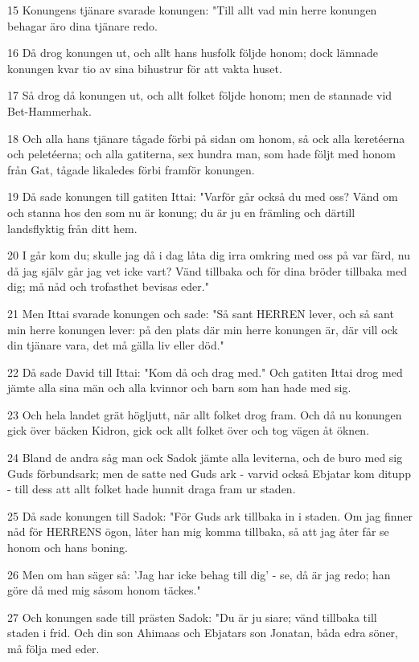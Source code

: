 \par 15 Konungens tjänare svarade konungen: "Till allt vad min herre konungen behagar äro dina tjänare redo.
\par 16 Då drog konungen ut, och allt hans husfolk följde honom; dock lämnade konungen kvar tio av sina bihustrur för att vakta huset.
\par 17 Så drog då konungen ut, och allt folket följde honom; men de stannade vid Bet-Hammerhak.
\par 18 Och alla hans tjänare tågade förbi på sidan om honom, så ock alla keretéerna och peletéerna; och alla gatiterna, sex hundra man, som hade följt med honom från Gat, tågade likaledes förbi framför konungen.
\par 19 Då sade konungen till gatiten Ittai: "Varför går också du med oss? Vänd om och stanna hos den som nu är konung; du är ju en främling och därtill landsflyktig från ditt hem.
\par 20 I går kom du; skulle jag då i dag låta dig irra omkring med oss på var färd, nu då jag själv går jag vet icke vart? Vänd tillbaka och för dina bröder tillbaka med dig; må nåd och trofasthet bevisas eder."
\par 21 Men Ittai svarade konungen och sade: "Så sant HERREN lever, och så sant min herre konungen lever: på den plats där min herre konungen är, där vill ock din tjänare vara, det må gälla liv eller död."
\par 22 Då sade David till Ittai: "Kom då och drag med." Och gatiten Ittai drog med jämte alla sina män och alla kvinnor och barn som han hade med sig.
\par 23 Och hela landet grät högljutt, när allt folket drog fram. Och då nu konungen gick över bäcken Kidron, gick ock allt folket över och tog vägen åt öknen.
\par 24 Bland de andra såg man ock Sadok jämte alla leviterna, och de buro med sig Guds förbundsark; men de satte ned Guds ark - varvid också Ebjatar kom ditupp - till dess att allt folket hade hunnit draga fram ur staden.
\par 25 Då sade konungen till Sadok: "För Guds ark tillbaka in i staden. Om jag finner nåd för HERRENS ögon, låter han mig komma tillbaka, så att jag åter får se honom och hans boning.
\par 26 Men om han säger så: 'Jag har icke behag till dig' - se, då är jag redo; han göre då med mig såsom honom täckes."
\par 27 Och konungen sade till prästen Sadok: "Du är ju siare; vänd tillbaka till staden i frid. Och din son Ahimaas och Ebjatars son Jonatan, båda edra söner, må följa med eder.
